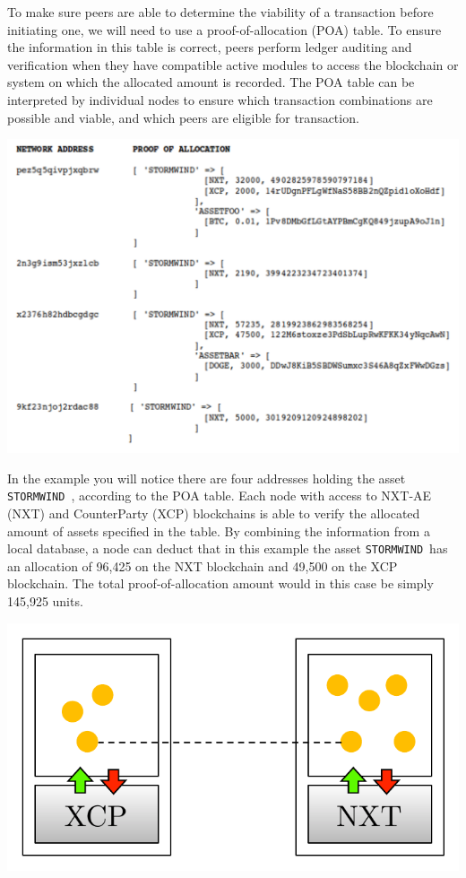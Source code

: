 \documentclass[11pt, a4paper]{article}
\newcommand{\stormwind}{\texttt{STORMWIND}\, }
\begin{document}
To make sure peers are able to determine the viability of a transaction before initiating one, we will need to use a proof-of-allocation (POA) table. To ensure the information in this table is correct, peers perform ledger auditing and verification when they have compatible active modules to access the blockchain or system on which the allocated amount is recorded. The POA table can be interpreted by individual nodes to ensure which transaction combinations are possible and viable, and which peers are eligible for transaction.

\begin{center}
\includegraphics[width=.7\textwidth]{images/poa_table.pdf}
\end{center}

In the example you will notice there are four addresses holding the asset \stormwind, according to the POA table. Each node with access to NXT-AE (NXT) and CounterParty (XCP) blockchains is able to verify the allocated amount of assets specified in the table. By combining the information from a local database, a node can deduct that in this example the asset \stormwind has an allocation of 96,425 on the NXT blockchain and 49,500 on the XCP blockchain. The total proof-of-allocation amount would in this case be simply 145,925 units.

\begin{center}
\includegraphics[width=.7\textwidth]{images/forumimg_valuetokens.pdf}
\end{center}
\end{document}
